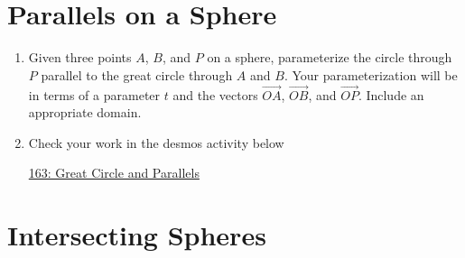 \documentclass{ximera}
\begin{document}
\section{Parallels on a Sphere}
\begin{question}  \label{Qdsft4hhhg}

\begin{enumerate}
\item{Given three points $A$, $B$, and $P$ on a sphere, parameterize the circle through $P$ parallel to the great circle through $A$ and $B$. Your parameterization will be in terms of a parameter $t$ and the vectors $\overrightarrow{OA}$, $\overrightarrow{OB}$, and $\overrightarrow{OP}$. Include an appropriate domain.}

\item{Check your work in the desmos activity below


\begin{onlineOnly}
    \begin{center}
\end{center}
\end{onlineOnly}

\href{https://www.desmos.com/3d/5xncpr9qoy}{163: Great Circle and Parallels}

}

\end{enumerate}

\end{question}


\section{Intersecting Spheres}
\end{document}

